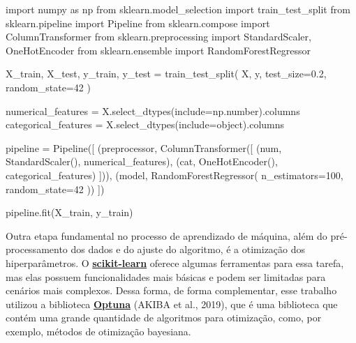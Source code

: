 \documentclass[
  12pt,
  a4paper,
]{scrreprt}
\newenvironment{Shaded}{}{}
\newcommand{\BuiltInTok}[1]{\textcolor[rgb]{0.84,0.23,0.29}{#1}}
\newcommand{\DecValTok}[1]{\textcolor[rgb]{0.00,0.36,0.77}{#1}}
\newcommand{\FloatTok}[1]{\textcolor[rgb]{0.00,0.36,0.77}{#1}}
\newcommand{\ImportTok}[1]{\textcolor[rgb]{0.01,0.18,0.38}{#1}}
\newcommand{\NormalTok}[1]{\textcolor[rgb]{0.14,0.16,0.18}{#1}}
\newcommand{\OperatorTok}[1]{\textcolor[rgb]{0.14,0.16,0.18}{#1}}
\newcommand{\StringTok}[1]{\textcolor[rgb]{0.01,0.18,0.38}{#1}}
\begin{document}
\begin{Shaded}
\begin{Highlighting}[]
\ImportTok{import}\NormalTok{ numpy }\ImportTok{as}\NormalTok{ np}
\ImportTok{from}\NormalTok{ sklearn.model\_selection }\ImportTok{import}\NormalTok{ train\_test\_split}
\ImportTok{from}\NormalTok{ sklearn.pipeline }\ImportTok{import}\NormalTok{ Pipeline}
\ImportTok{from}\NormalTok{ sklearn.compose }\ImportTok{import}\NormalTok{ ColumnTransformer}
\ImportTok{from}\NormalTok{ sklearn.preprocessing }\ImportTok{import}\NormalTok{ StandardScaler, OneHotEncoder}
\ImportTok{from}\NormalTok{ sklearn.ensemble }\ImportTok{import}\NormalTok{ RandomForestRegressor}

\NormalTok{X\_train, X\_test, y\_train, y\_test }\OperatorTok{=}\NormalTok{ train\_test\_split(}
\NormalTok{    X, y,}
\NormalTok{    test\_size}\OperatorTok{=}\FloatTok{0.2}\NormalTok{,}
\NormalTok{    random\_state}\OperatorTok{=}\DecValTok{42}
\NormalTok{)}

\NormalTok{numerical\_features }\OperatorTok{=}\NormalTok{ X.select\_dtypes(include}\OperatorTok{=}\NormalTok{np.number).columns}
\NormalTok{categorical\_features }\OperatorTok{=}\NormalTok{ X.select\_dtypes(include}\OperatorTok{=}\BuiltInTok{object}\NormalTok{).columns}

\NormalTok{pipeline }\OperatorTok{=}\NormalTok{ Pipeline([}
\NormalTok{    (}\StringTok{\textquotesingle{}preprocessor\textquotesingle{}}\NormalTok{, ColumnTransformer([}
\NormalTok{        (}\StringTok{\textquotesingle{}num\textquotesingle{}}\NormalTok{, StandardScaler(), numerical\_features),}
\NormalTok{        (}\StringTok{\textquotesingle{}cat\textquotesingle{}}\NormalTok{, OneHotEncoder(), categorical\_features)}
\NormalTok{    ])),}
\NormalTok{    (}\StringTok{\textquotesingle{}model\textquotesingle{}}\NormalTok{, RandomForestRegressor(}
\NormalTok{        n\_estimators}\OperatorTok{=}\DecValTok{100}\NormalTok{,}
\NormalTok{        random\_state}\OperatorTok{=}\DecValTok{42}
\NormalTok{    ))}
\NormalTok{])}

\NormalTok{pipeline.fit(X\_train, y\_train)}
\end{Highlighting}
\end{Shaded}

Outra etapa fundamental no processo de aprendizado de máquina, além do
pré-processamento dos dados e do ajuste do algoritmo, é a otimização dos
hiperparâmetros. O
\href{https://scikit-learn.org/stable/}{\textbf{scikit-learn}} oferece
algumas ferramentas para essa tarefa, mas elas possuem funcionalidades
mais básicas e podem ser limitadas para cenários mais complexos. Dessa
forma, de forma complementar, esse trabalho utilizou a biblioteca
\href{https://optuna.org/}{\textbf{Optuna}} (AKIBA et al., 2019), que é
uma biblioteca que contém uma grande quantidade de algoritmos para
otimização, como, por exemplo, métodos de otimização bayesiana.
\end{document}

